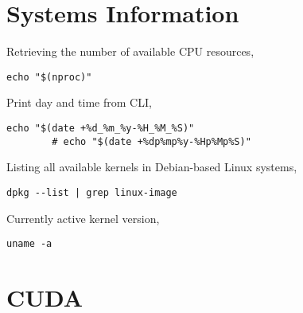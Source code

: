 \documentclass[12pt, a4paper]{scrbook}
\numberwithin{equation}{section}
\theoremstyle{definition}
\theoremstyle{definition}
\begin{document}
	\section{Systems Information}
	
	Retrieving the number of available CPU resources,
	
	\begin{lstlisting}[style=mystylebash, label=alg:nproc, xleftmargin=\parindent]
		echo "$(nproc)"
	\end{lstlisting}

	Print day and time from CLI,
	
	\begin{lstlisting}[style=mystylebash, label=alg:cli_date, xleftmargin=\parindent]
		echo "$(date +%d_%m_%y-%H_%M_%S)"
		# echo "$(date +%dp%mp%y-%Hp%Mp%S)"
	\end{lstlisting}

	Listing all available kernels in Debian-based Linux systems, 
	
	\begin{lstlisting}[style=mystylebash, label=alg:ubuntu_kernel, xleftmargin=\parindent]
		dpkg --list | grep linux-image
	\end{lstlisting}
	
	Currently active kernel version,
	
	\begin{lstlisting}[style=mystylebash, label=alg:ubuntu_kernel__current, xleftmargin=\parindent]
		uname -a
	\end{lstlisting}

	\section{CUDA}
	
\end{document}
